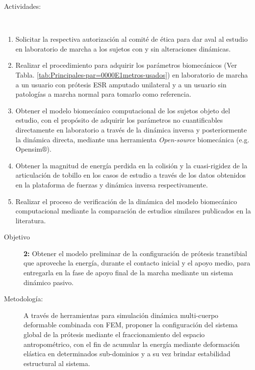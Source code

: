 \documentclass[12pt,english]{article}
\begin{document}
\begin{description}
\item [{Actividades:}]~\end{description}
\begin{enumerate}
\item Solicitar la respectiva autorización al comité de ética para dar aval
al estudio en laboratorio de marcha a los sujetos con y sin alteraciones dinámicas.
\item Realizar el procedimiento para adquirir los parámetros biomecánicos
(Ver Tabla. \ref{tab:Principales-par=0000E1metros-usados}) en laboratorio
de marcha a un usuario con prótesis
ESR amputado unilateral y a un usuario sin patologías a marcha
normal para tomarlo como referencia.
\item Obtener el modelo biomecánico computacional de los sujetos objeto
del estudio, con el propósito de adquirir los parámetros no cuantificables
directamente en laboratorio a través de la dinámica inversa y posteriormente
la dinámica directa, mediante una herramienta \emph{Open-source } biomecánica (e.g.
Opensim$\circledR$).
\item Obtener la magnitud de energía perdida en la colisión y la cuasi-rigidez
de la articulación de tobillo en los casos de estudio a través de
los datos obtenidos en la plataforma de fuerzas y dinámica inversa
respectivamente.
\item Realizar el proceso de verificación de la dinámica del modelo biomecánico computacional mediante la comparación de estudios similares publicados en la literatura.\end{enumerate}
\begin{description}
\item [{Objetivo}]  \textbf{ 2: }Obtener el modelo preliminar de la configuración
de prótesis transtibial que aproveche la energía, durante el contacto
inicial y el apoyo medio, para entregarla en la fase de apoyo final
de la marcha mediante un sistema dinámico pasivo.
\item [{Metodología:}] A través de herramientas para simulación dinámica
multi-cuerpo deformable combinada con FEM, proponer la configuración del sistema global de la prótesis mediante el fraccionamiento del espacio antropométrico, con el fin de acumular la energía mediante deformación elástica en determinados sub-dominios y a su vez brindar estabilidad estructural al sistema.
\end{description}
\end{document}
